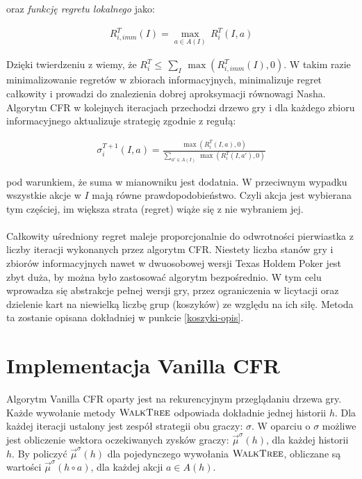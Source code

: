 \documentclass[magisterska]{pracamgr}
\begin{document}
\noindent
oraz \emph{funkcję regretu lokalnego} jako:

\begin{align*}
R_{i, imm}^T(I) = \max_{a \in A(I)} \, R_i^T(I, a)
\end{align*}

\noindent
Dzięki twierdzeniu z \cite{cfr} wiemy, że $R_i^T \leq \, \sum_{I} \, \max(R_{i, imm}^T(I), 0)$. W takim razie
minimalizowanie regretów w zbiorach informacyjnych, minimalizuje regret całkowity i prowadzi do znalezienia
dobrej aproksymacji równowagi Nasha. \\

\noindent
Algorytm CFR w kolejnych iteracjach przechodzi drzewo gry i dla każdego zbioru informacyjnego aktualizuje strategię
zgodnie z regułą:

\begin{align*}
\sigma_i^{T+1} (I, a) = \frac{\max(R_i^T(I, a), 0)}{\sum\limits_{a' \in A(I)} \, \max(R_i^T(I, a'), 0)}
\end{align*}

\noindent
pod warunkiem, że suma w mianowniku jest dodatnia. W przeciwnym wypadku wszystkie akcje w $I$ mają równe prawdopodobieństwo.
Czyli akcja jest wybierana tym częściej, im większa strata (regret) wiąże się z nie wybraniem jej.\\\\

\noindent
Całkowity uśredniony regret maleje proporcjonalnie do odwrotności pierwiastka z liczby iteracji wykonanych przez algorytm CFR. Niestety
liczba stanów gry i zbiorów informacyjnych nawet w dwuosobowej wersji Texas Holdem Poker jest zbyt duża, by można było
zastosować algorytm bezpośrednio. W tym celu wprowadza się abstrakcje pełnej wersji gry, przez ograniczenia w licytacji
oraz dzielenie kart na niewielką liczbę grup (koszyków) ze względu na ich siłę. Metoda ta zostanie opisana dokładniej
w punkcie \ref{koszyki-opis}. \\

\section{Implementacja Vanilla CFR}
\label{impl-cfr}

\noindent
Algorytm Vanilla CFR oparty jest na rekurencyjnym przeglądaniu drzewa gry. Każde wywołanie metody $\Call{WalkTree}{}$ odpowiada dokładnie jednej
historii $h$. Dla każdej iteracji ustalony jest zespół strategii obu
graczy: $\sigma$. W oparciu o $\sigma$ możliwe jest obliczenie wektora oczekiwanych zysków graczy: $\vec{\mu}^{\sigma}(h)$, dla każdej historii $h$.
By policzyć $\vec{\mu}^{\sigma}(h)$ dla pojedynczego wywołania $\Call{WalkTree}{}$, obliczane są wartości $\vec{\mu}^{\sigma}(h \circ a)$, dla każdej
akcji $a \in A(h)$. \\ 
\end{document}
